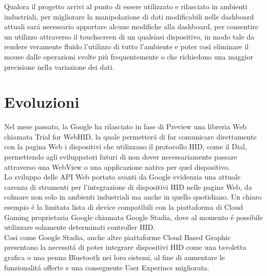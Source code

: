 Qualora il progetto arrivi al punto di essere utilizzato e rilasciato in ambienti industriali, per migliorare la manipolazione di dati modificabili nelle dashboard attuali sará necessario apportare alcune modifiche alla dashboard, per consentire un utilizzo attraverso il touchscreen di un qualsiasi dispositivo, in modo tale da rendere veramente fluido l’utilizzo di tutto l’ambiente e poter così eliminare il mouse dalle operazioni svolte più frequentemente o che richiedono una maggior precisione nella variazione dei dati.\\



\section{Evoluzioni}

Nel mese passato, la Google ha rilasciato in fase di Preview una libreria Web chiamata Trial for WebHID, la quale permetterá di far comunicare direttamente con la pagina Web i dispositivi che utilizzano il protocollo HID, come il Dial, permettendo agli sviluppatori futuri di non dover necessariamente passare attraverso una WebView o una applicazione nativa per quel dispositivo.\\

Lo sviluppo delle API Web portato avanti da Google evidenzia una attuale carenza di strumenti per l'integrazione di dispositivi HID nelle pagine Web, da colmare non solo in ambienti industriali ma anche in quello quotidiano. Un chiaro esempio é la limitata lista di device compatibili con la piattaforma di Cloud Gaming proprietaria Google chiamata Google Stadia, dove al momento é possibile utilizzare solamente determinati controller HID.\\

Cosi come Google Stadia, anche altre piattaforme Cloud Based Graphic presentano la necessitá di poter integrare dispositivi HID come una tavoletta grafica o una penna Bluetooth nei loro sistemi, al fine di aumentare le funzionalitá offerte e una conseguente User Experince migliorata.\\